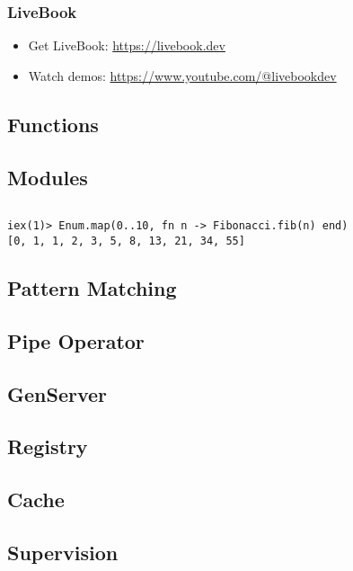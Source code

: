 {\subsubsection{LiveBook}

\begin{itemize}
  \item Get LiveBook: \url{https://livebook.dev}
  \item Watch demos: \url{https://www.youtube.com/@livebookdev}
\end{itemize}

\subsection{Functions}

\subsection{Modules}

\inputminted[fontsize=\normalsize]{elixir}{../src/elixir/fibonacci.ex}

\begin{verbatim}
iex(1)> Enum.map(0..10, fn n -> Fibonacci.fib(n) end)
[0, 1, 1, 2, 3, 5, 8, 13, 21, 34, 55]
\end{verbatim}

\subsection{Pattern Matching}

\subsection{Pipe Operator}

\subsection{GenServer}

\subsection{Registry}

\subsection{Cache}

\subsection{Supervision}
}
